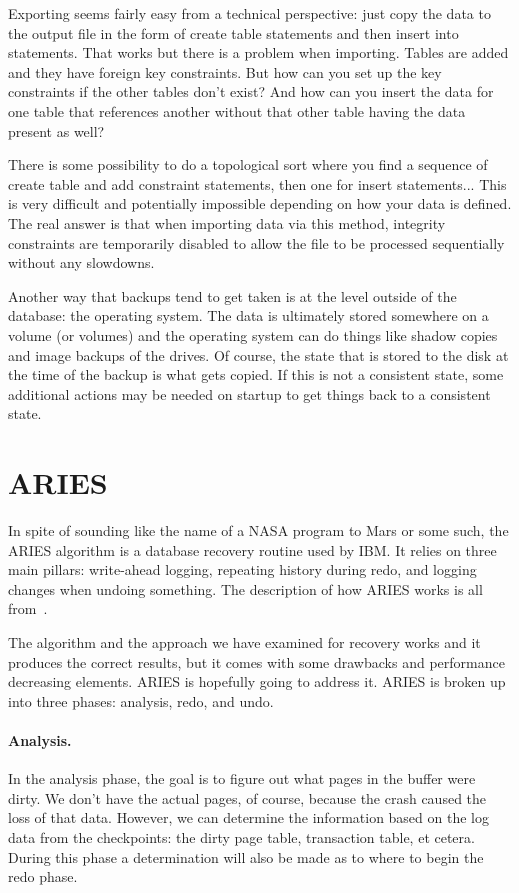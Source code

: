 \documentclass[a4paper]{report}
\begin{document}
Exporting seems fairly easy from a technical perspective: just copy the data to the output file in the form of create table statements and then insert into statements. That works but there is a problem when importing. Tables are added and they have foreign key constraints. But how can you set up the key constraints if the other tables don't exist? And how can you insert the data for one table that references another without that other table having the data present as well?

There is some possibility to do a topological sort where you find a sequence of create table and add constraint statements, then one for insert statements... This is very difficult and potentially impossible depending on how your data is defined. The real answer is that when importing data via this method, integrity constraints are temporarily disabled to allow the file to be processed sequentially without any slowdowns.

Another way that backups tend to get taken is at the level outside of the database: the operating system. The data is ultimately stored somewhere on a volume (or volumes) and the operating system can do things like shadow copies and image backups of the drives. Of course, the state that is stored to the disk at the time of the backup is what gets copied. If this is not a consistent state, some additional actions may be needed on startup to get things back to a consistent state.

\section*{ARIES}
In spite of sounding like the name of a NASA program to Mars or some such, the ARIES algorithm is a database recovery routine used by IBM. It relies on three main pillars: write-ahead logging, repeating history during redo, and logging changes when undoing something. The description of how ARIES works is all from~\cite{fds}.

The algorithm and the approach we have examined for recovery works and it produces the correct results, but it comes with some drawbacks and performance decreasing elements. ARIES is hopefully going to address it. ARIES is broken up into three phases: analysis, redo, and undo.

\paragraph{Analysis.} In the analysis phase, the goal is to figure out what pages in the buffer were dirty. We don't have the actual pages, of course, because the crash caused the loss of that data. However, we can determine the information based on the log data from the checkpoints: the dirty page table, transaction table, et cetera. During this phase a determination will also be made as to where to begin the redo phase.
\end{document}
